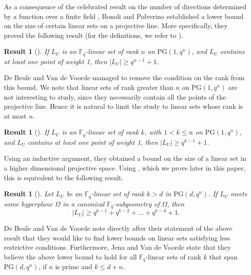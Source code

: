 \documentclass[11pt]{article}
\newtheorem{result}[theorem]{Result}
\theoremstyle{definition}
\newcommand{\fq}{{\mathbb F}_{q}}
\newcommand{\PG}{\mathrm{PG}}
\newcommand{\pg}{\PG}
\begin{document}
As a consequence of the celebrated result on the number of directions determined by a function over a finite field \cite{blokhuis1999number,ball2003number}, Bonoli and Polverino established a lower bound on the size of certain linear sets on a projective line.
More specifically, they proved the following result (for the definitions, we refer to ).

\begin{result}[{\cite[Lemma 2.2]{bonoli2005fqlinear}}]
 \label{res:MinSizeLineRankN}
 If $L_U$ is an $\fq$-linear set of rank $n$ on $\PG(1,q^n)$, and $L_U$ contains at least one point of weight 1, then $|L_U| \geq q^{n-1} + 1$.
\end{result}

De Beule and Van de Voorde managed to remove the condition on the rank from this bound.
We note that linear sets of rank greater than $n$ on $\PG(1,q^n)$ are not interesting to study, since they necessarily contain all the points of the projective line.
Hence it is natural to limit the study to linear sets whose rank is at most $n$.

\begin{result}[{\cite[Theorem 1.2]{debeule2019theminimumsize}}]
 \label{res:JanGeertruiLine}
 If $L_U$ is an $\fq$-linear set of rank $k$, with $1 < k \leq n$ on $\PG(1,q^n)$, and $L_U$ contains at least one point of weight 1, then $|L_U| \geq q^{k-1} + 1$.
\end{result}

Using an inductive argument, they obtained a bound on the size of a linear set in a higher dimensional projective space.
Using , which we prove later in this paper, this is equivalent to the following result.

\begin{result}[{\cite[Theorem 4.4]{debeule2019theminimumsize}}]
 \label{res:JanGeertrui}
 Let $L_U$ be an $\fq$-linear set of rank $k > d$ in $\PG(d,q^n)$.
 If $L_U$ meets some hyperplane $\Omega$ in a canonical $\fq$-subgeometry of $\Omega$, then
 \[
  |L_U| \geq q^{k-1} + q^{k-2} + \ldots + q^{k-d} + 1.
 \]
\end{result}

De Beule and Van de Voorde note directly after their statement of the above result that they would like to find lower bounds on linear sets satisfying less restrictive conditions.
Furthermore, Jena and Van de Voorde \cite[\S 2.5 (B)]{Jena2021onlinearsets} state that they believe the above lower bound to hold for all $\fq$-linear sets of rank $k$ that span $\pg(d,q^n)$, if $n$ is prime and $k \leq d+n$.
\end{document}
